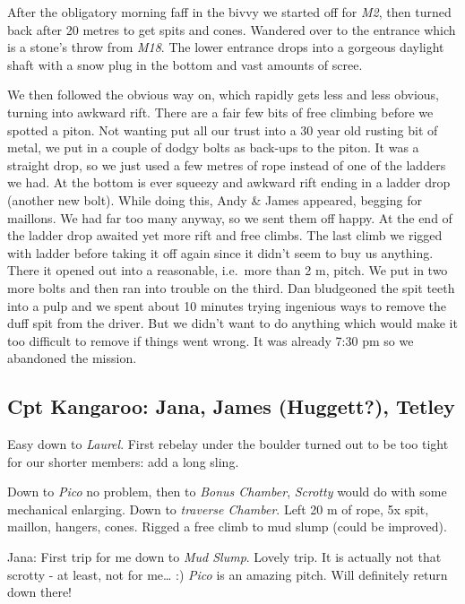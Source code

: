 After the obligatory morning faff in the bivvy we started off for
\emph{M2}, then turned back after 20 metres to get spits and cones.
Wandered over to the entrance which is a stone's throw from \emph{M18}.
The lower entrance drops into a gorgeous daylight shaft with a snow plug
in the bottom and vast amounts of scree.

We then followed the obvious way on, which rapidly gets less and less
obvious, turning into awkward rift. There are a fair few bits of free
climbing before we spotted a piton. Not wanting put all our trust into a
30 year old rusting bit of metal, we put in a couple of dodgy bolts as
back-ups to the piton. It was a straight drop, so we just used a few
metres of rope instead of one of the ladders we had. At the bottom is
ever squeezy and awkward rift ending in a ladder drop (another new
bolt). While doing this, Andy \& James appeared, begging for maillons.
We had far too many anyway, so we sent them off happy. At the end of the
ladder drop awaited yet more rift and free climbs. The last climb we
rigged with ladder before taking it off again since it didn't seem to
buy us anything. There it opened out into a reasonable, i.e.~more than 2
m, pitch. We put in two more bolts and then ran into trouble on the
third. Dan bludgeoned the spit teeth into a pulp and we spent about 10
minutes trying ingenious ways to remove the duff spit from the driver.
But we didn't want to do anything which would make it too difficult to
remove if things went wrong. It was already 7:30 pm so we abandoned the
mission.


\subsection{Cpt Kangaroo: Jana, James (Huggett?),
Tetley}

Easy down to \emph{Laurel}. First rebelay under the boulder turned out
to be too tight for our shorter members: add a long sling.

Down to \emph{Pico} no problem, then to \emph{Bonus Chamber},
\emph{Scrotty} would do with some mechanical enlarging. Down to
\emph{traverse Chamber}. Left 20 m of rope, 5x spit, maillon, hangers,
cones. Rigged a free climb to mud slump (could be improved).

Jana: First trip for me down to \emph{Mud Slump}. Lovely trip. It is
actually not that scrotty - at least, not for me\ldots{} :) \emph{Pico}
is an amazing pitch. Will definitely return down there!

